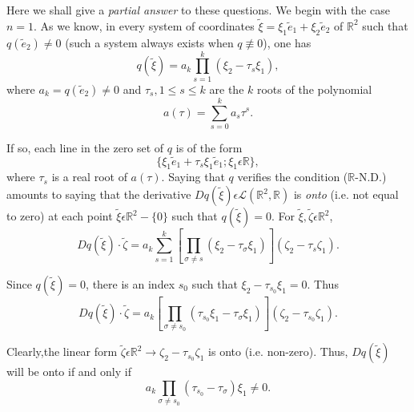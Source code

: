 Here we shall give a {\em partial answer} to these questions. We begin with the case $n = 1$. As we know, in every system of coordinates $\widetilde{\xi} = \xi_{1} \widetilde{e}_{1} + \xi_{2}\widetilde{e}_{2}$ of $\mathbb{R}^{2}$ such that $q(\widetilde{e}_{2}) \neq 0$ (such a system always exists when $q \nequiv 0$), one has
\begin{equation*}
q(\widetilde{\xi}) = a_{k} \prod_{s=1}^{k} (\xi_{2} - \tau_{s}\xi_{1}),\tag{2.1}\label{chap2-eq2.1}
\end{equation*}
where $a_{k} = q(\widetilde{e}_{2}) \neq 0$ and $\tau_{s}, 1 \leq s \leq k$ are the $k$ roots of the polynomial 
\begin{equation*}
a(\tau) = \sum\limits_{s=0}^{k} a_{s} \tau^{s}.\tag{2.2}\label{chap2-eq2.2}
\end{equation*}

If so, each line in the zero set of $q$ is of the form
\begin{equation*}
\{\xi_{1} \widetilde{e}_{1} + \tau_{s} \xi_{1} \widetilde{e}_{1} ; \xi_{1} \epsilon \mathbb{R} \},\tag{2.3}\label{chap2-eq2.3}
\end{equation*}
where $\tau_{s}$ is a real root of $a(\tau)$. Saying that $q$ verifies the condition ($\mathbb{R}$-N.D.) amounts to saying that the derivative $Dq(\widetilde{\xi}) \epsilon \mathscr{L}(\mathbb{R}^{2}, \mathbb{R})$ is {\em onto} (i.e. not equal to zero) at each point $\widetilde{\xi} \epsilon \mathbb{R}^{2} - \{0\}$ such that $q(\widetilde{\xi}) = 0$. For $\widetilde{\xi}, \widetilde{\zeta} \epsilon \mathbb{R}^{2}$,
\begin{equation*}
Dq(\widetilde{\xi}) \cdot \widetilde{\zeta} = a_{k} \sum\limits_{s=1}^{k} \left[ \prod_{\sigma \neq s} (\xi_{2} - \tau_{\sigma} \xi_{1})\right] (\zeta_{2} - \tau_{s} \zeta_{1}).\tag{2.4}\label{chap2-eq2.4}
\end{equation*}

Since $q(\widetilde{\xi}) = 0$, there is an index $s_{0}$ such that $\xi_{2} - \tau_{s_{0}} \xi_{1} = 0$. Thus
$$
Dq(\widetilde{\xi}) \cdot \widetilde{\zeta} = a_{k} \left[\prod_{\sigma \neq s_{0}} (\tau_{s_{0}} \xi_{1} - \tau_{\sigma} \xi_{1}) \right] (\zeta_{2} - \tau_{s_{0}} \zeta_{1}).
$$

Clearly,\pageoriginale the linear form $\widetilde{\zeta} \epsilon \mathbb{R}^{2} \to \zeta_{2} - \tau_{s_{0}} \zeta_{1}$ is onto (i.e. non-zero). Thus, $Dq(\widetilde{\xi})$ will be onto if and only if
\begin{equation*}
a_{k} \prod_{\sigma \neq s_{0}} (\tau_{s_{0}} - \tau_{\sigma}) \xi_{1} \neq 0.\tag{2.5}\label{chap2-eq2.5}
\end{equation*}

